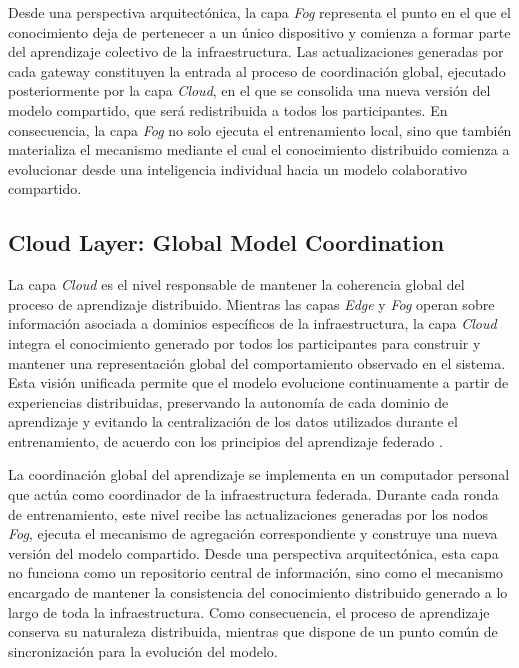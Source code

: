 \documentclass[journal,article,submit,moreauthors]{Definitions/mdpi}
\begin{document}
Desde una perspectiva arquitectónica, la capa \textit{Fog} representa el punto en el que el conocimiento deja de pertenecer a un único dispositivo y comienza a formar parte del aprendizaje colectivo de la infraestructura. Las actualizaciones generadas por cada gateway constituyen la entrada al proceso de coordinación global, ejecutado posteriormente por la capa \textit{Cloud}, en el que se consolida una nueva versión del modelo compartido, que será redistribuida a todos los participantes. En consecuencia, la capa \textit{Fog} no solo ejecuta el entrenamiento local, sino que también materializa el mecanismo mediante el cual el conocimiento distribuido comienza a evolucionar desde una inteligencia individual hacia un modelo colaborativo compartido.

\subsection{Cloud Layer: Global Model Coordination}
La capa \textit{Cloud} es el nivel responsable de mantener la coherencia global del proceso de aprendizaje distribuido. Mientras las capas \textit{Edge} y \textit{Fog} operan sobre información asociada a dominios específicos de la infraestructura, la capa \textit{Cloud} integra el conocimiento generado por todos los participantes para construir y mantener una representación global del comportamiento observado en el sistema. Esta visión unificada permite que el modelo evolucione continuamente a partir de experiencias distribuidas, preservando la autonomía de cada dominio de aprendizaje y evitando la centralización de los datos utilizados durante el entrenamiento, de acuerdo con los principios del aprendizaje federado \cite{McMahan2017,Imteaj2022,Ramadan2025}.
%

La coordinación global del aprendizaje se implementa en un computador personal que actúa como coordinador de la infraestructura federada. Durante cada ronda de entrenamiento, este nivel recibe las actualizaciones generadas por los nodos \textit{Fog}, ejecuta el mecanismo de agregación correspondiente y construye una nueva versión del modelo compartido. Desde una perspectiva arquitectónica, esta capa no funciona como un repositorio central de información, sino como el mecanismo encargado de mantener la consistencia del conocimiento distribuido generado a lo largo de toda la infraestructura. Como consecuencia, el proceso de aprendizaje conserva su naturaleza distribuida, mientras que dispone de un punto común de sincronización para la evolución del modelo.
\end{document}
